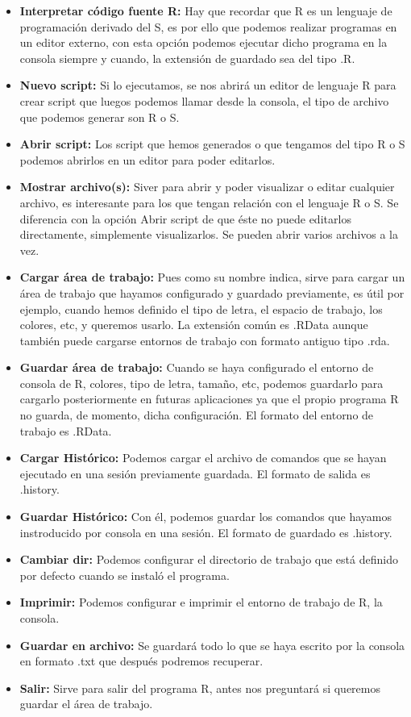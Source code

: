 \documentclass[11pt,a4paper,oneside]{book}\usepackage[]{graphicx}\usepackage[]{color}
\begin{document}
\begin{itemize}
      \item {\bf Interpretar código fuente R:} Hay que recordar que R es un lenguaje de programación derivado del S, es por ello que podemos realizar programas en un editor externo, con esta opción podemos ejecutar dicho programa en la consola siempre y cuando, la extensión de guardado sea del tipo .R.
      \item {\bf Nuevo script:} Si lo ejecutamos, se nos abrirá un editor de lenguaje R para crear script que luegos podemos llamar desde la consola, el tipo de archivo que podemos generar son R o S.
      \item {\bf Abrir script:} Los script que hemos generados o que tengamos del tipo R o S podemos abrirlos en un editor para poder editarlos.
      \item {\bf Mostrar archivo(s):} Siver para abrir y poder visualizar o editar cualquier archivo, es interesante para los que tengan relación con el lenguaje R o S. Se diferencia con la opción Abrir script de que éste no puede editarlos directamente, simplemente visualizarlos. Se pueden abrir varios archivos a la vez.
      \item {\bf Cargar área de trabajo:} Pues como su nombre indica, sirve para cargar un área de trabajo que hayamos configurado y guardado previamente, es útil por ejemplo, cuando hemos definido el tipo de letra, el espacio de trabajo, los colores, etc, y queremos usarlo. La extensión común es .RData aunque también puede cargarse entornos de trabajo con formato antiguo tipo .rda.
      \item {\bf Guardar área de trabajo:} Cuando se haya configurado el entorno de consola de R, colores, tipo de letra, tamaño, etc, podemos guardarlo para cargarlo posteriormente en futuras aplicaciones ya que el propio programa R no guarda, de momento, dicha configuración. El formato del entorno de trabajo es .RData.
      \item {\bf Cargar Histórico:} Podemos cargar el archivo de comandos que se hayan ejecutado en una sesión previamente guardada. El formato de salida es .history.
      \item {\bf Guardar Histórico:} Con él, podemos guardar los comandos que hayamos instroducido por consola en una sesión. El formato de guardado es .history.
      \item {\bf Cambiar dir:} Podemos configurar el directorio de trabajo que está definido por defecto cuando se instaló el programa.
      \item {\bf Imprimir:} Podemos configurar e imprimir el entorno de trabajo de R, la consola.
      \item {\bf Guardar en archivo:} Se guardará todo lo que se haya escrito por la consola en formato .txt que después podremos recuperar.
      \item {\bf Salir:} Sirve para salir del programa R, antes nos preguntará si queremos guardar el área de trabajo.
\end{itemize}
\end{document}

